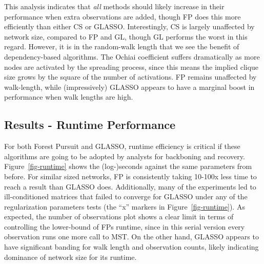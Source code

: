 \documentclass[%
	12pt,
		oneside,
		letterpaper
]{book}
\begin{document}
This analysis indicates that \emph{all} methods should likely increase
in their performance when extra observations are added, though FP does
this more efficiently than either CS or GLASSO. Interestingly, CS is
largely unaffected by network size, compared to FP and GL, though GL
performs the worst in this regard. However, it is in the random-walk
length that we see the benefit of dependency-based algorithms. The
Ochiai coefficient suffers dramatically as more nodes are activated by
the spreading process, since this means the implied clique size grows by
the square of the number of activations. FP remains unaffected by
walk-length, while (impressively) GLASSO appears to have a marginal
boost in performance when walk lengths are high.

\subsection{Results - Runtime
Performance}\label{results---runtime-performance}

For both Forest Pursuit and GLASSO, runtime efficiency is critical if
these algorithms are going to be adopted by analysts for backboning and
recovery. Figure~\ref{fig-runtime} shows the (log-)seconds against the
same parameters from before. For similar sized networks, FP is
consistently taking 10-100x less time to reach a result than GLASSO
does. Additionally, many of the experiments led to ill-conditioned
matrices that failed to converge for GLASSO under any of the
regularization parameters tests (the ``x'' markers in
Figure~\ref{fig-runtime}). As expected, the number of observations plot
shows a clear limit in terms of controlling the lower-bound of FPs
runtime, since in this serial version every observation runs one more
call to MST. On the other hand, GLASSO appears to have significant
banding for walk length and observation counts, likely indicating
dominance of network size for its runtime.
\end{document}

